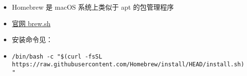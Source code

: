 
\begin{issues}
\issueDraft
\end{issues}

\begin{itemize}
\item Homebrew 是 macOS 系统上类似于 apt 的包管理程序
\item \href{https://brew.sh}{官网 brew.sh}
\item 安装命令见：
\item \verb|/bin/bash -c "$(curl -fsSL https://raw.githubusercontent.com/Homebrew/install/HEAD/install.sh)"|
\end{itemize}
